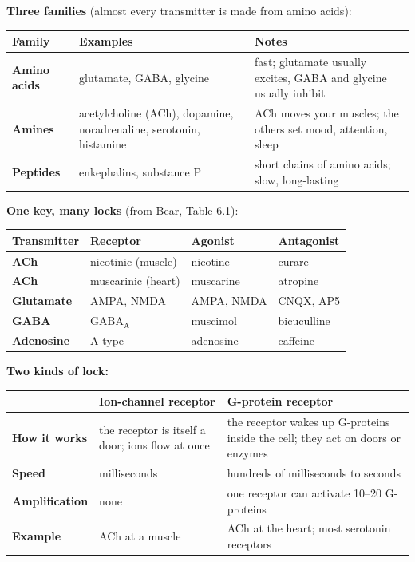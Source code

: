 \documentclass[12pt,a4paper]{article}
\begin{document}
\textbf{Three families} (almost every transmitter is made from amino acids):

{\renewcommand{\arraystretch}{1.35}
\begin{tabular}{@{}>{\bfseries}p{3.4cm}p{6.4cm}p{6.4cm}@{}}
\toprule
Family & Examples & Notes\\
\midrule
Amino acids & glutamate, GABA, glycine & fast; glutamate usually excites, GABA and glycine usually inhibit\\
Amines & acetylcholine (ACh), dopamine, noradrenaline, serotonin, histamine & ACh moves your muscles; the others set mood, attention, sleep\\
Peptides & enkephalins, substance P & short chains of amino acids; slow, long-lasting\\
\bottomrule
\end{tabular}}

\medskip
\textbf{One key, many locks} (from Bear, Table 6.1):

{\renewcommand{\arraystretch}{1.3}
\begin{tabular}{@{}>{\bfseries}p{3.0cm}p{4.2cm}p{4.1cm}p{4.3cm}@{}}
\toprule
Transmitter & Receptor & Agonist & Antagonist\\
\midrule
ACh & nicotinic (muscle) & nicotine & curare\\
ACh & muscarinic (heart) & muscarine & atropine\\
Glutamate & AMPA, NMDA & AMPA, NMDA & CNQX, AP5\\
GABA & GABA$_\mathrm{A}$ & muscimol & bicuculline\\
Adenosine & A type & adenosine & caffeine\\
\bottomrule
\end{tabular}}

\medskip
\textbf{Two kinds of lock:}

{\renewcommand{\arraystretch}{1.35}
\begin{tabular}{@{}>{\bfseries}p{3.4cm}p{6.4cm}p{6.4cm}@{}}
\toprule
 & Ion-channel receptor & G-protein receptor\\
\midrule
How it works & the receptor is itself a door; ions flow at once & the receptor wakes up G-proteins inside the cell; they act on doors or enzymes\\
Speed & milliseconds & hundreds of milliseconds to seconds\\
Amplification & none & one receptor can activate 10--20 G-proteins\\
Example & ACh at a muscle & ACh at the heart; most serotonin receptors\\
\bottomrule
\end{tabular}}
\end{document}
